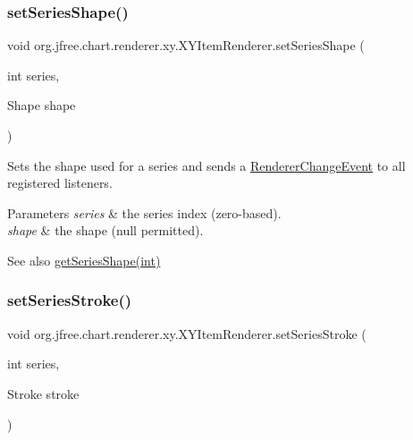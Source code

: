 \subsubsection{\texorpdfstring{set\+Series\+Shape()}{setSeriesShape()}}
{\footnotesize\ttfamily void org.\+jfree.\+chart.\+renderer.\+xy.\+X\+Y\+Item\+Renderer.\+set\+Series\+Shape (\begin{DoxyParamCaption}\item[{int}]{series,  }\item[{Shape}]{shape }\end{DoxyParamCaption})}

Sets the shape used for a series and sends a \mbox{\hyperlink{}{Renderer\+Change\+Event}} to all registered listeners.


\begin{DoxyParams}{Parameters}
{\em series} & the series index (zero-\/based). \\
\hline
{\em shape} & the shape ({\ttfamily null} permitted).\\
\hline
\end{DoxyParams}
\begin{DoxySeeAlso}{See also}
\mbox{\hyperlink{interfaceorg_1_1jfree_1_1chart_1_1renderer_1_1xy_1_1_x_y_item_renderer_ac84c5f4c56b840b3c53cf69cf6504994}{get\+Series\+Shape(int)}} 
\end{DoxySeeAlso}
\mbox{\label{interfaceorg_1_1jfree_1_1chart_1_1renderer_1_1xy_1_1_x_y_item_renderer_a177adecc8b87f936d6efcdd31bae876b}} 
\subsubsection{\texorpdfstring{set\+Series\+Stroke()}{setSeriesStroke()}}
{\footnotesize\ttfamily void org.\+jfree.\+chart.\+renderer.\+xy.\+X\+Y\+Item\+Renderer.\+set\+Series\+Stroke (\begin{DoxyParamCaption}\item[{int}]{series,  }\item[{Stroke}]{stroke }\end{DoxyParamCaption})}

